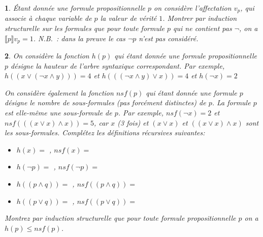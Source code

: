 \documentclass[a4paper,10pt,french]{article}
\newtheorem{exi}{}
\newenvironment{exo}{\begin{exi}\em}{\end{exi}}
\newcommand{\rsem}{\rrbracket}
\newcommand{\inte}[2]{\llbracket #1 \rsem {#2}}
\begin{document}
\begin{exo}
  Étant donnée une formule propositionnelle $p$ 
  on considère l'affectation $v_p$, qui associe à chaque variable de
  $p$ la valeur de vérité $1$.
  Montrer par induction structurelle sur les formules que pour toute formule
  $p$ qui ne contient pas $\neg$, on a $\inte{p}{v_p}=1$.
  N.B.~: dans la preuve le cas $\neg p$ n'est pas considéré.
  
  \framebox[\textwidth]{
  \rule[-0.4cm]{0mm}{8.5cm}
  }
  
\end{exo}

\begin{exo}
  On considère la fonction $h(p)$ qui étant donnée une formule
  propositionnelle $p$ désigne la hauteur de l'arbre syntaxique correspondant.
  Par exemple, $h((x\vee(\neg x \land y)))=4$ et
  $h(((\neg x \land y) \vee x))=4$ et 
  $h(\neg x) = 2$

  On considère également la fonction $\mathit{nsf}(p)$ qui étant donnée une formule
  $p$ désigne le nombre de sous-formules (pas forcément distinctes)
  de $p$. La formule $p$ est elle-même une sous-formule
  de $p$. Par exemple, $\mathit{nsf}(\neg x) = 2$ et
  $\mathit{nsf}(((x \vee x) \land x)) = 5$, car $x$ (3 fois) et $(x \vee x)$
  et $((x \vee x) \land x)$ sont les sous-formules.
    Complétez les définitions récursives suivantes:
  \begin{itemize}
  \item $h(x) = $ \framebox[1cm]{\rule[-0.2cm]{0mm}{0.5cm}},
    $\mathit{nsf}(x) = $ \framebox[1cm]{\rule[-0.2cm]{0mm}{0.5cm}}
  \item $h(\neg p) = $ \framebox[3cm]{\rule[-0.2cm]{0mm}{0.5cm}},
    $\mathit{nsf}(\neg p) = $ \framebox[3cm]{\rule[-0.2cm]{0mm}{0.5cm}}
  \item $h((p \land q)) = $ \framebox[4cm]{\rule[-0.2cm]{0mm}{0.5cm}},
    $\mathit{nsf}((p \land q)) = $ \framebox[4cm]{\rule[-0.2cm]{0mm}{0.5cm}}
    \item $h((p \vee q)) = $ \framebox[4cm]{\rule[-0.2cm]{0mm}{0.5cm}},
        $\mathit{nsf}((p \vee q)) = $ \framebox[4cm]{\rule[-0.2cm]{0mm}{0.5cm}}
  \end{itemize}
  
  Montrez par induction structurelle que pour toute formule propositionnelle
  $p$ on a $h(p) \leq \mathit{nsf}(p)$.\\[2ex]
   \framebox[\textwidth]{
    \rule[-0.4cm]{0mm}{13cm}
   }
\end{exo}
\end{document}

